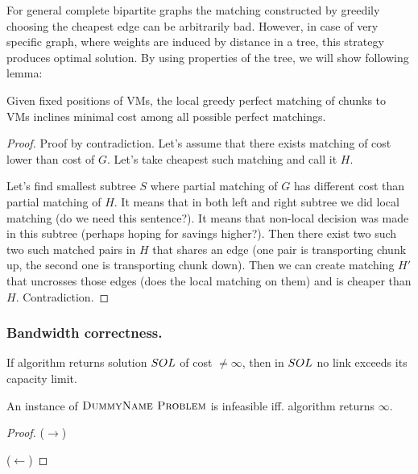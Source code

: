 For general complete bipartite graphs the matching constructed by greedily choosing the cheapest edge can be arbitrarily bad.
However, in case of very specific graph, where weights are induced by distance in a tree, this strategy produces optimal solution.
By using properties of the tree, we will show following lemma:

\begin{lemma}
  Given fixed positions of VMs, the local greedy perfect matching of chunks to VMs inclines minimal cost among all possible perfect matchings.
\end{lemma}

\begin{proof}
Proof by contradiction. Let's assume that there exists matching of cost lower than cost of $G$. Let's take cheapest such matching and call it $H$.

Let's find smallest subtree $S$ where partial matching of $G$ has different cost than partial matching of $H$. It means that in both left and right subtree we did local matching (do we need this sentence?). It means that non-local decision was made in this subtree (perhaps hoping for savings higher?). Then there exist two such two such matched pairs in $H$ that shares an edge (one pair is transporting chunk up, the second one is transporting chunk down). Then we can create matching $H'$ that uncrosses those edges (does the local matching on them) and is cheaper than $H$. Contradiction.


\end{proof}


\subsubsection{Bandwidth correctness.}

\begin{lemma}
  If algorithm returns solution $SOL$ of cost $\neq \infty$, then in $SOL$ no link exceeds its capacity limit.
  \end{lemma}

\begin{lemma}
An instance of $\textsc{DummyName Problem}$ is infeasible iff. algorithm returns $\infty$.
\end{lemma}
\begin{proof}
  ($\rightarrow$)

  ($\leftarrow$)
  \end{proof}


